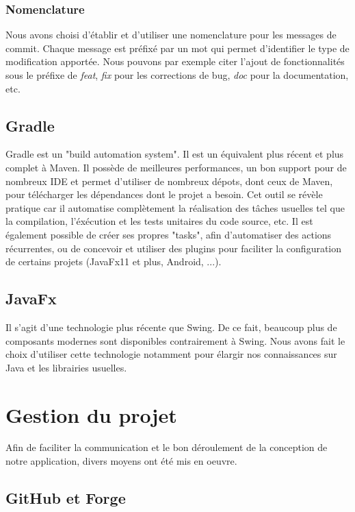 			\subsubsection{Nomenclature}

				Nous avons choisi d'établir et d'utiliser une nomenclature pour les messages de commit. Chaque message est préfixé par un mot qui permet d'identifier le type de modification apportée. Nous pouvons par exemple citer l'ajout de fonctionnalités sous le préfixe de \textit{feat}, \textit{fix} pour les corrections de bug, \textit{doc} pour la documentation, etc.

		\subsection{Gradle}

			Gradle est un "build automation system". Il est un équivalent plus récent et plus complet à Maven. Il possède de meilleures performances, un bon support pour de nombreux IDE et permet d'utiliser de nombreux dépots, dont ceux de Maven, pour télécharger les dépendances dont le projet a besoin. Cet outil se révèle pratique car il automatise complètement la réalisation des tâches usuelles tel que la compilation, l'éxécution et les tests unitaires du code source, etc. Il est également possible de créer ses propres "tasks", afin d'automatiser des actions récurrentes, ou de concevoir et utiliser des plugins pour faciliter la configuration de certains projets (JavaFx11 et plus, Android, ...).

		\subsection{JavaFx}

			Il s'agit d'une technologie plus récente que Swing. De ce fait, beaucoup plus de composants modernes sont disponibles contrairement à Swing. Nous avons fait le choix d'utiliser cette technologie notamment pour élargir nos connaissances sur Java et les librairies usuelles.

	\section{Gestion du projet}

		Afin de faciliter la communication et le bon déroulement de la conception de notre application, divers moyens ont été mis en oeuvre.

		\subsection{GitHub et Forge}

